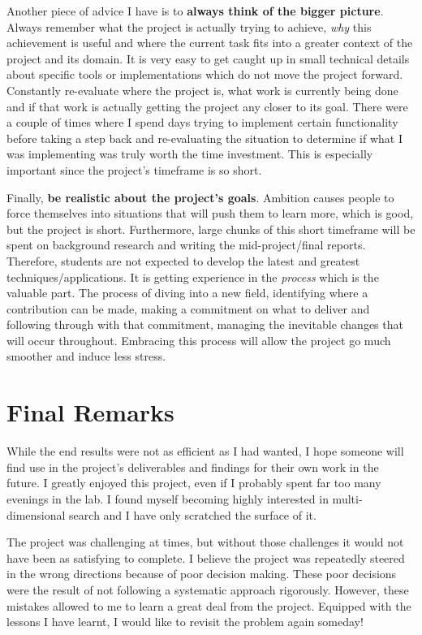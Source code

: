 Another piece of advice I have is to \textbf{always think of the bigger picture}. Always remember what the project is actually trying to achieve, \textit{why} this achievement is useful and where the current task fits into a greater context of the project and its domain. It is very easy to get caught up in small technical details about specific tools or implementations which do not move the project forward. Constantly re-evaluate where the project is, what work is currently being done and if that work is actually getting the project any closer to its goal. There were a couple of times where I spend days trying to implement certain functionality before taking a step back and re-evaluating the situation to determine if what I was implementing was truly worth the time investment. This is especially important since the project's timeframe is so short.

Finally, \textbf{be realistic about the project's goals}. Ambition causes people to force themselves into situations that will push them to learn more, which is good, but the project is short. Furthermore, large chunks of this short timeframe will be spent on background research and writing the mid-project/final reports. Therefore, students are not expected to develop the latest and greatest techniques/applications. It is getting experience in the \textit{process} which is the valuable part. The process of diving into a new field, identifying where a contribution can be made, making a commitment on what to deliver and following through with that commitment, managing the inevitable changes that will occur throughout. Embracing this process will allow the project go much smoother and induce less stress.

\section{Final Remarks}

While the end results were not as efficient as I had wanted, I hope someone will find use in the project's deliverables and findings for their own work in the future. I greatly enjoyed this project, even if I probably spent far too many evenings in the lab. I found myself becoming highly interested in multi-dimensional search and I have only scratched the surface of it. 

The project was challenging at times, but without those challenges it would not have been as satisfying to complete. I believe the project was repeatedly steered in the wrong directions because of poor decision making. These poor decisions were the result of not following a systematic approach rigorously. However, these mistakes allowed to me to learn a great deal from the project. Equipped with the lessons I have learnt, I would like to revisit the problem again someday!